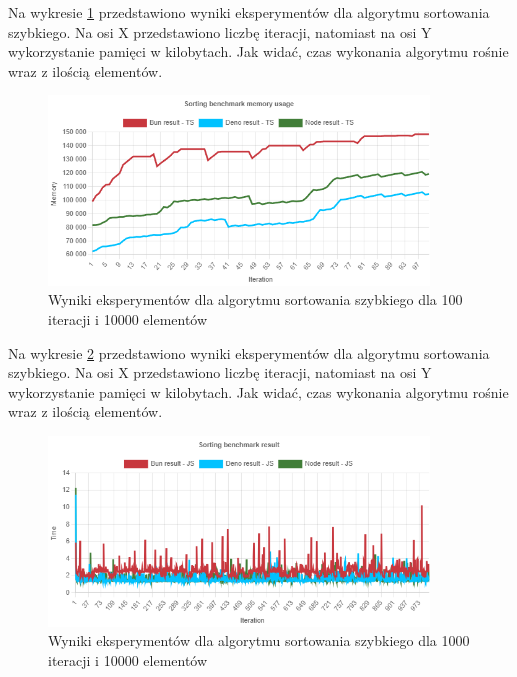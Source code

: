 Na wykresie \ref{fig:radix_sorting_e5_memory_ts} przedstawiono wyniki eksperymentów dla algorytmu sortowania szybkiego. Na osi X przedstawiono liczbę iteracji, natomiast na osi Y wykorzystanie pamięci w kilobytach. Jak widać, czas wykonania algorytmu rośnie wraz z ilością elementów.
\begin{figure}[H]
  \centering
  \includegraphics[width=0.9\textwidth]{Figures/sorting/radix/e5_memory_ts.png}
  \caption{Wyniki eksperymentów dla algorytmu sortowania szybkiego dla 100 iteracji i 10000 elementów}
  \label{fig:radix_sorting_e5_memory_ts}
\end{figure}

Na wykresie \ref{fig:radix_sorting_e6} przedstawiono wyniki eksperymentów dla algorytmu sortowania szybkiego. Na osi X przedstawiono liczbę iteracji, natomiast na osi Y wykorzystanie pamięci w kilobytach. Jak widać, czas wykonania algorytmu rośnie wraz z ilością elementów.
\begin{figure}[H]
  \centering
  \includegraphics[width=0.9\textwidth]{Figures/sorting/radix/e6_js.png}
  \caption{Wyniki eksperymentów dla algorytmu sortowania szybkiego dla 1000 iteracji i 10000 elementów}
  \label{fig:radix_sorting_e6}
\end{figure}

